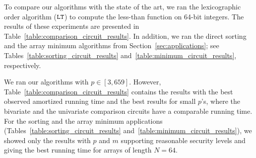 To compare our algorithms with the state of the art, we ran the lexicographic order algorithm ($\mathtt{LT}$) to compute the less-than function on 64-bit integers.
The results of these experiments are presented in Table~\ref{table:comparison_circuit_results}.
In addition, we ran the direct sorting and the array minimum algorithms from Section~\ref{sec:applications}; see Tables~\ref{table:sorting_circuit_results} and~\ref{table:minimum_circuit_results}, respectively.

We ran our algorithms with $p \in [3,659]$.
However, Table~\ref{table:comparison_circuit_results} contains the results with the best observed amortized running time and the best results for small $p$'s, where the bivariate and the univariate comparison circuits have a comparable running time.
For the sorting and the array minimum applications (Tables~\ref{table:sorting_circuit_results} and~\ref{table:minimum_circuit_results}), we showed only the results with $p$ and $m$ supporting reasonable security levels and giving the best running time for arrays of length $N=64$.

